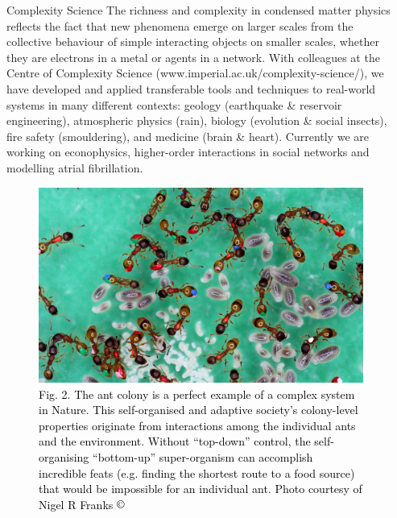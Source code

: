 \documentclass[xcolor={table}]{beamer}
\begin{document}
\begin{frame}[fragile=singleslide,t]
\begin{columns}[onlytextwidth,T]
\begin{column}{.47\textwidth}
\begin{block}{Complexity Science}
The richness and complexity in condensed matter physics reflects the fact that
new phenomena emerge on larger scales from the collective behaviour of simple
interacting objects on smaller scales, whether they are electrons in a metal or agents in a network. With colleagues at the Centre of Complexity Science (www.imperial.ac.uk/complexity-science/), we have developed and applied transferable tools and techniques to real-world systems in many different contexts: geology (earthquake \& reservoir
engineering), atmospheric physics (rain), biology (evolution \& social insects), fire safety (smouldering), and medicine (brain \& heart). Currently we are working on econophysics, higher-order interactions in social networks and modelling atrial fibrillation.
\end{block}
\vspace*{-1.5cm}
\begin{figure}
    \centering
    \includegraphics[width=0.9\columnwidth]{Temnothorax-albipennis-copyright-Nigel-R-Franks.jpg}
    \caption{\footnotesize \textcolor{black}{Fig. 2. The ant colony is a perfect example of a complex system in Nature. This self-organised and adaptive society's colony-level properties originate from interactions among the individual ants and the environment. Without ``top-down'' control, the self-organising ``bottom-up'' super-organism can accomplish incredible feats (e.g. finding the shortest route to a food source) that would be impossible for an individual ant. Photo 
    courtesy of Nigel R Franks $\copyright$}}
\end{figure}

\end{column}

\begin{column}{.47\textwidth}


\end{column}
\end{columns}
\end{frame}
\end{document}
